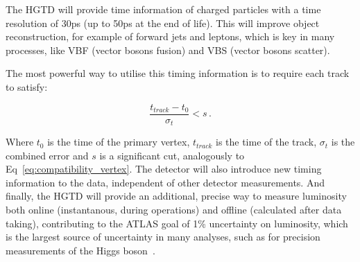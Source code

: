 
The HGTD will provide time information of charged particles with a time resolution of 30ps (up to 50ps at the end of life). %
This will improve object reconstruction, for example of forward jets and leptons, which is key in many processes, like VBF (vector bosons fusion) and VBS (vector bosons scatter). %

The most powerful way to utilise this timing information is to require each track to satisfy:

\begin{equation}
    \frac{t_{track}-t_0}{\sigma_t} < s \,.
\end{equation}

Where $t_0$ is the time of the primary vertex, $t_{track}$ is the time of the track, $\sigma_t$ is the combined error and $s$ is a significant cut, analogously to Eq~\ref{eq:compatibility_vertex}. %
The detector will also introduce new timing information to the data, independent of other detector measurements. And finally, the HGTD will provide an additional, precise way to measure luminosity both online (instantanous, during operations) and offline (calculated after data taking), contributing to the ATLAS goal of 1\% uncertainty on luminosity, which is the largest source of uncertainty in many analyses, such as for precision measurements of the Higgs boson~\cite{CERN-LHCC-2020-007}.


